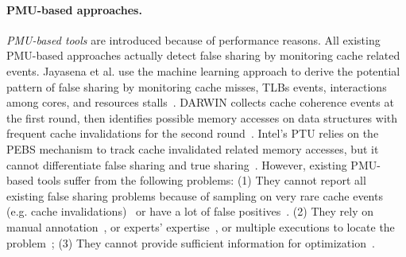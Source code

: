 \paragraph{PMU-based approaches.} \emph{PMU-based tools} are introduced because of performance reasons. All existing PMU-based approaches actually detect false sharing by monitoring cache related events. Jayasena et al. use the machine learning approach to derive the potential pattern of false sharing by monitoring  cache misses, TLBs events, interactions among cores, and resources stalls~\cite{mldetect}. DARWIN collects cache coherence events at the first round, then identifies possible memory accesses on data structures with frequent cache invalidations for the second round~\cite{Wicaksono11detectingfalse}. Intel's PTU relies on the PEBS mechanism to track cache invalidated related memory accesses, but it cannot differentiate false sharing and true sharing~\cite{detect:ptu}. However, existing PMU-based tools suffer from the following problems: (1) They cannot report all existing false sharing problems because of sampling on very rare cache events (e.g. cache invalidations)~\cite{mldetect, Wicaksono11detectingfalse, DProf} or have a lot of false positives~\cite{detect:ptu}.  (2) They rely on manual annotation~\cite{DProf}, or experts' expertise~\cite{Wicaksono11detectingfalse, detect:ptu}, or multiple executions to locate the problem~\cite{Wicaksono11detectingfalse}; (3) They cannot provide sufficient information for optimization~\cite{mldetect, Wicaksono11detectingfalse, detect:ptu, DProf}.



